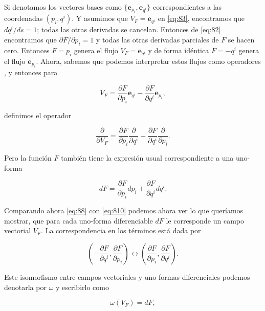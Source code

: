 \documentclass[a4paper,10pt]{article}
\numberwithin{equation}{section}
\begin{document}
Si denotamos los vectores bases como $\{\mathbf{e}_{p_i},\mathbf{e}_{q^i}\}$ 
correspondientes a las coordenadas $(p_i,q^i)$. Y asumimos que $V_F = \mathbf{e}_{q^i}$ 
en \eqref{eq:83}, encontramos que $dq^i/ds = 1$; todas las otras derivadas se cancelan. 
Entonces de \eqref{eq:82} encontramos que $\partial F / \partial p_i = 1$ y todas las 
otras derivadas parciales de $F$ se hacen cero. Entonces $F = p_i$ genera el flujo 
$V_F = \mathbf{e}_{q^i}$ y de forma idéntica $F = -q^i$ genera el flujo 
$\mathbf{e}_{p_{i}}$. Ahora, sabemos que podemos interpretar estos flujos como 
operadores \cite{rasband}, y entonces para

\begin{equation}
 V_F = \frac{\partial F}{\partial p_i}\mathbf{e}_{q^i} - \frac{\partial F}{\partial q^i}\mathbf{e}_{p_{i}},
\label{eq:88}
\end{equation}

definimos el operador

\begin{equation}
 \frac{\partial}{\partial V_F} = \frac{\partial F}{\partial p_i}\frac{\partial}{\partial q^i}
 - \frac{\partial F}{\partial q^i}\frac{\partial}{\partial p_i}.
\end{equation}

Pero la función $F$ también tiene la expresión usual correspondiente a una uno-forma

\begin{equation}
 dF = \frac{\partial F}{\partial p_i}dp_i + \frac{\partial F}{\partial q^i}dq^i.
 \label{eq:810}
\end{equation}

Comparando ahora \eqref{eq:88} con \eqref{eq:810} podemos ahora ver lo que queríamos 
mostrar, que para cada uno-forma diferenciable $dF$ le corresponde un campo vectorial 
$V_F$. La correspondencia en los términos está dada por 

\begin{equation}
 \left(- \frac{\partial F}{\partial q^i}, \frac{\partial F}{\partial p_i}\right) \leftrightarrow
 \left( \frac{\partial F}{\partial p_i}, \frac{\partial F}{\partial q^i}\right).
 \label{eq:811}
\end{equation}

Este isomorfismo entre campos vectoriales y uno-formas diferenciales podemos denotarla 
por $\omega$ y escribirlo como 

\begin{equation}
 \omega(V_F) = dF,
  \label{eq:812}
\end{equation}
\end{document}
